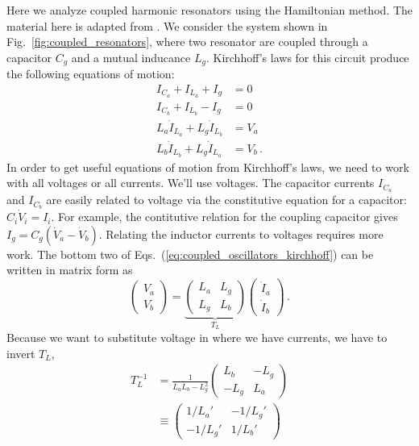

Here we analyze coupled harmonic resonators using the Hamiltonian method.
The material here is adapted from \cite{Sank:balanced_coupling:2025}.
We consider the system shown in Fig.~\ref{fig:coupled_resonators}, where two resonator are coupled through a capacitor $C_g$ and a mutual inducance $L_g$.
Kirchhoff's laws for this circuit produce the following equations of motion:
\begin{align}
  I_{C_a} + I_{L_a} + I_g &= 0 \nonumber \\
  I_{C_b} + I_{L_b} - I_g &= 0 \nonumber \\
  L_a \dot I_{L_a} + L_g \dot I_{L_b} &= V_a \nonumber \\
  L_b \dot I_{L_b} + L_g \dot I_{L_a} &= V_b
  \label{eq:coupled_oscillators_kirchhoff}
  \, .
\end{align}
In order to get useful equations of motion from Kirchhoff's laws, we need to work with all voltages or all currents.
We'll use voltages.
The capacitor currents $I_{C_a}$ and $I_{C_b}$ are easily related to voltage via the constitutive equation for a capacitor: $C_i \dot V_i = I_i$.
For example, the contitutive relation for the coupling capacitor gives $I_g = C_g (\dot V_a - \dot V_b)$.
Relating the inductor currents to voltages requires more work.
The bottom two of Eqs.~(\ref{eq:coupled_oscillators_kirchhoff}) can be written in matrix form as
\begin{equation*}
  \begin{pmatrix} V_a \\ V_b \end{pmatrix}
  = \underbrace{ \begin{pmatrix}
    L_a & L_g \\
    L_g & L_b
  \end{pmatrix}}_{T_L}
  \begin{pmatrix} \dot I_a \\ \dot I_b \end{pmatrix}
  \, .
\end{equation*}
Because we want to substitute voltage in where we have currents, we have to invert $T_L$,
\begin{align*}
  T_L^{-1}
  &= \frac{1}{L_a L_b - L_g^2} \begin{pmatrix}
    L_b & -L_g \\ -L_g & L_a
  \end{pmatrix} \\
  & \equiv \begin{pmatrix}
    1 / L_a' & -1 / L_g' \\ -1 / L_g' & 1 / L_b'
  \end{pmatrix}
\end{align*}
